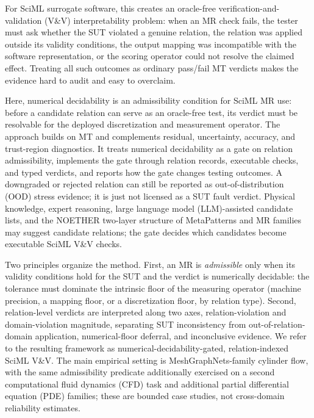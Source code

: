 \documentclass[preprint,12pt]{elsarticle}
\begin{document}
For SciML surrogate software, this creates an oracle-free verification-and-validation (V\&V) interpretability problem: when an MR check fails, the tester must ask whether the SUT violated a genuine relation, the relation was applied outside its validity conditions, the output mapping was incompatible with the software representation, or the scoring operator could not resolve the claimed effect. Treating all such outcomes as ordinary pass/fail MT verdicts makes the evidence hard to audit and easy to overclaim.

Here, numerical decidability is an admissibility condition for SciML MR use: before a candidate relation can serve as an oracle-free test, its verdict must be resolvable for the deployed discretization and measurement operator. The approach builds on MT and complements residual, uncertainty, accuracy, and trust-region diagnostics. It treats numerical decidability as a gate on relation admissibility, implements the gate through relation records, executable checks, and typed verdicts, and reports how the gate changes testing outcomes. A downgraded or rejected relation can still be reported as out-of-distribution (OOD) stress evidence; it is just not licensed as a SUT fault verdict. Physical knowledge, expert reasoning, large language model (LLM)-assisted candidate lists, and the NOETHER two-layer structure of MetaPatterns and MR families \citep{zhao2026noether} may suggest candidate relations; the gate decides which candidates become executable SciML V\&V checks.

Two principles organize the method. First, an MR is \emph{admissible} only when its validity conditions hold for the SUT and the verdict is numerically decidable: the tolerance must dominate the intrinsic floor of the measuring operator (machine precision, a mapping floor, or a discretization floor, by relation type). Second, relation-level verdicts are interpreted along two axes, relation-violation and domain-violation magnitude, separating SUT inconsistency from out-of-relation-domain application, numerical-floor deferral, and inconclusive evidence. We refer to the resulting framework as numerical-decidability-gated, relation-indexed SciML V\&V. The main empirical setting is MeshGraphNets-family cylinder flow, with the same admissibility predicate additionally exercised on a second computational fluid dynamics (CFD) task and additional partial differential equation (PDE) families; these are bounded case studies, not cross-domain reliability estimates.
\end{document}

